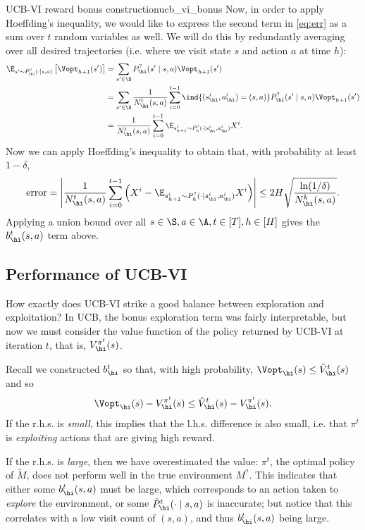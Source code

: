 \documentclass[\main/main]{subfiles}
\begin{document}
\begin{derivation}{UCB-VI reward bonus construction}{ucb_vi_bonus}
    Now, in order to apply Hoeffding's inequality, we would like to express the second term in \eqref{eq:err} as a sum over $t$ random variables as well. We will do this by redundantly averaging over all desired trajectories (i.e. where we visit state $s$ and action $a$ at time $h$):
    \begin{align*}
        \E_{s' \sim P^?_\hi(\cdot \mid s, a)} \left[ \Vopt_{h+1}(s') \right]
        &= \sum_{s' \in \S} P^?_\hi(s' \mid s, a) \Vopt_{h+1}(s') \\
        &= \sum_{s' \in \S} \frac{1}{N^t_\hi(s, a)} \sum_{i=0}^{t-1} \ind{ (s_\hi^i, a_\hi^i) = (s, a) } P^?_\hi(s' \mid s, a) \Vopt_{h+1}(s') \\
        &= \frac{1}{N^t_\hi(s, a)} \sum_{i=0}^{t-1} \E_{s_{h+1}^i \sim P^?_{h}(\cdot \mid s_\hi^i, a_\hi^i)} X^i.
    \end{align*}
    Now we can apply Hoeffding's inequality to obtain that, with probability at least $1-\delta$,
    \[
        \text{error} = \left| \frac{1}{N^t_\hi(s, a)} \sum_{i=0}^{t-1} \left(X^i - \E_{s_{h+1}^i \sim P^?_{h}(\cdot \mid s_\hi^i, a_\hi^i)} X^i \right) \right| \le 2 H \sqrt{\frac{\ln(1/\delta)}{N_\hi^k(s, a)}}.
    \]
    Applying a union bound over all $s \in \S, a \in \A, t \in [T], h \in [H]$ gives the $b_\hi^t(s, a)$ term above.
\end{derivation}

\subsection{Performance of UCB-VI}

How exactly does UCB-VI strike a good balance between exploration and exploitation? In UCB, the bonus exploration term was fairly interpretable, but now we must consider the value function of the policy returned by UCB-VI at iteration $t$, that is, $V^{\pi^t}_\hi(s)$.

Recall we constructed $b^t_\hi$ so that, with high probability, $\Vopt_\hi(s) \le \hat{V}_\hi^t(s)$ and so \[
    \Vopt_\hi(s) - V^{\pi^t}_\hi(s) \le \hat{V}_\hi^t(s) - V^{\pi^t}_\hi(s).
\]
If the r.h.s. is \emph{small}, this implies that the l.h.s. difference is also small, i.e. that $\pi^t$ is \emph{exploiting} actions that are giving high reward.

If the r.h.s. is \emph{large}, then we have overestimated the value: $\pi^t$, the optimal policy of $\tilde{M}$, does not perform well in the true environment $M^?$. This indicates that either some $b_\hi^t(s, a)$ must be large, which corresponds to an action taken to \emph{explore} the environment, or some $\hat P^t_\hi(\cdot \mid s, a)$ is inaccurate; but notice that this correlates with a low visit count of $(s, a)$, and thus $b_\hi^t(s, a)$ being large.
\end{document}
